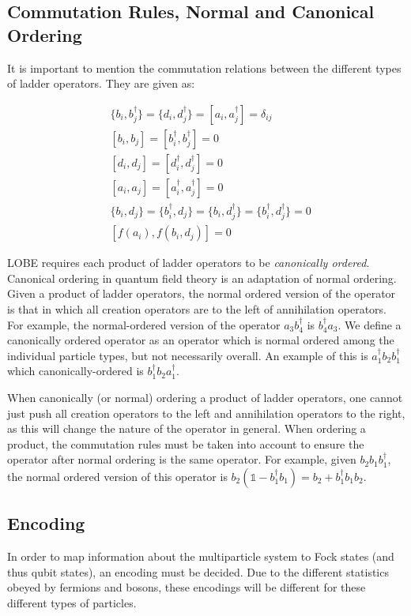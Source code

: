\subsection{Commutation Rules, Normal and Canonical Ordering}
\label{subsec:commutation}
It is important to mention the commutation relations between the different types of ladder operators. They are given as:

\begin{align*}
    &\{b_i, b_j^\dagger\} = \{d_i, d_j^\dagger\} = [a_i, a_j^\dagger] = \delta_{ij}\\
    & [b_i, b_j] = [b_i^\dagger, b_j^\dagger] = 0 \\
    & [d_i, d_j] = [d_i^\dagger, d_j^\dagger] = 0 \\
    & [a_i, a_j] = [a_i^\dagger, a_j^\dagger] = 0 \\
    & \{b_i, d_j\} = \{b_i^\dagger, d_j\} = \{b_i, d_j^\dagger\} = \{b_i^\dagger, d_j^\dagger\} = 0\\
    & [f(a_i), f(b_i, d_j)] = 0
\end{align*}

LOBE requires each product of ladder operators to be \emph{canonically ordered}. Canonical ordering in quantum field theory is an adaptation of normal ordering. Given a product of ladder operators, the normal ordered version of the operator is that in which all creation operators are to the left of annihilation operators.
For example, the normal-ordered version of the operator $a_3 b_4^\dagger$ is $b_4^\dagger a_3$. We define a canonically ordered operator as an operator which is normal ordered among the individual particle types, but not necessarily overall. An example of this is $a_1^\dagger b_2 b_1^\dagger$ which canonically-ordered is $b_1^\dagger b_2 a_1^\dagger$.

When canonically (or normal) ordering a product of ladder operators, one cannot just push all creation operators to the left and annihilation operators to the right, as this will change the nature of the operator in general. When ordering a product, the commutation rules must be taken into account to ensure the operator after normal ordering is the same operator.
For example, given $b_2 b_1 b_1^\dagger$, the normal ordered version of this operator is $b_2 \left(\mathbb{1} - b_1^\dagger b_1 \right) = b_2 + b_1^\dagger b_1 b_2$.

\subsection{Encoding}
\label{subsec:encoding}
In order to map information about the multiparticle system to Fock states (and thus qubit states), an encoding must be decided. Due to the different statistics obeyed by fermions and bosons, these encodings will be different for these different types of particles. 

